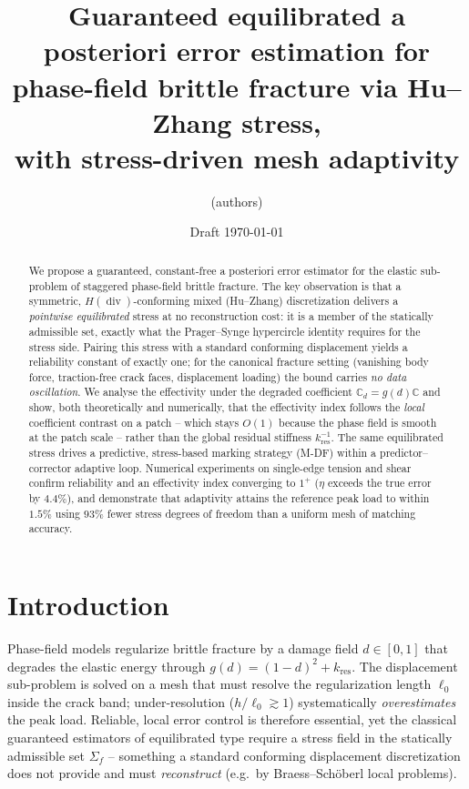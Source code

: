 \documentclass[11pt]{article}
\title{Guaranteed equilibrated a posteriori error estimation for
phase-field brittle fracture via Hu--Zhang stress,\\
with stress-driven mesh adaptivity}
\author{(authors)}
\date{Draft \today}
\newcommand{\dv}{\operatorname{div}}
\newcommand{\CC}{\mathbb{C}}
\newcommand{\Cd}{\mathbb{C}_d}
\newcommand{\kres}{k_{\mathrm{res}}}
\begin{document}
\maketitle

\begin{abstract}
We propose a guaranteed, constant-free a posteriori error estimator for the
elastic sub-problem of staggered phase-field brittle fracture. The key
observation is that a symmetric, $H(\dv)$-conforming mixed (Hu--Zhang)
discretization delivers a \emph{pointwise equilibrated} stress at no
reconstruction cost: it is a member of the statically admissible set, exactly
what the Prager--Synge hypercircle identity requires for the stress side.
Pairing this stress with a standard conforming displacement yields a
reliability constant of exactly one; for the canonical fracture setting
(vanishing body force, traction-free crack faces, displacement loading) the
bound carries \emph{no data oscillation}. We analyse the effectivity under the
degraded coefficient $\Cd=g(d)\CC$ and show, both theoretically and
numerically, that the effectivity index follows the \emph{local} coefficient
contrast on a patch -- which stays $O(1)$ because the phase field is smooth at
the patch scale -- rather than the global residual stiffness $\kres^{-1}$. The
same equilibrated stress drives a predictive, stress-based marking strategy
(M-DF) within a predictor--corrector adaptive loop. Numerical experiments on
single-edge tension and shear confirm reliability and an effectivity index
converging to $1^+$ ($\eta$ exceeds the true error by $4.4\%$), and demonstrate
that adaptivity attains the reference peak load to within $1.5\%$ using
$93\%$ fewer stress degrees of freedom than a uniform mesh of matching accuracy.
\end{abstract}

\section{Introduction}
Phase-field models regularize brittle fracture by a damage field
$d\in[0,1]$ that degrades the elastic energy through $g(d)=(1-d)^2+\kres$. The
displacement sub-problem is solved on a mesh that must resolve the regularization
length $\ell_0$ inside the crack band; under-resolution ($h/\ell_0\gtrsim1$)
systematically \emph{overestimates} the peak load. Reliable, local error control
is therefore essential, yet the classical guaranteed estimators of equilibrated
type require a stress field in the statically admissible set $\Sigma_f$ --
something a standard conforming displacement discretization does not provide and
must \emph{reconstruct} (e.g.\ by Braess--Sch\"oberl local problems).
\end{document}
